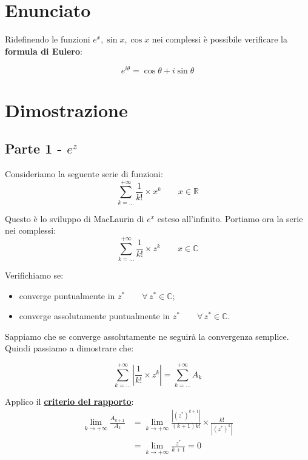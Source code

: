 \documentclass[../../dimostrazioni]{subfiles}
\begin{document}
        \section*{Enunciato}

            Ridefinendo le funzioni \( e^x, \sin x, \cos x \) nei complessi è possibile verificare la \textbf{formula di Eulero}:

                \[  e^{i\theta} = \cos \theta + i \sin \theta \]

        \section*{Dimostrazione}

            \subsection*{Parte 1 - \(e^z\)}    

                Consideriamo la seguente serie di funzioni:
                \[  \sum_{k=\dots}^{+\infty} \frac{1}{k!} \times x^k \qquad x \in \mathbb{R}  \]

                Questo è lo sviluppo di MacLaurin di \(e^x\) esteso all'infinito. Portiamo ora la serie nei complessi:
                \[  \sum_{k=\dots}^{+\infty} \frac{1}{k!} \times z^k \qquad x \in \mathbb{C}  \]

                Verifichiamo se:
                \begin{itemize}
                    \item converge puntualmente in \(z^* \qquad \forall \, z^*  \in \mathbb{C}\);
                    \item converge assolutamente puntualmente in \(z^* \qquad \forall \, z^*  \in \mathbb{C}\).
                \end{itemize}
            
                Sappiamo che se converge assolutamente ne seguirà la convergenza semplice. Quindi passiamo a dimostrare che:

                \[  \sum_{k=\dots}^{+\infty} \left| \frac{1}{k!} \times z^k \right| = \sum_{k=\dots}^{+\infty} A_k \]

                Applico il \textbf{\hyperref[criterioRapportoSerie]{criterio del rapporto}}:
                \begin{align*}
                    \lim_{k \to +\infty} \frac{A_{k+1}}{A_k} &= \lim_{k \to +\infty} \frac{\left|(z^*)^{k+1}\right|}{(k+1)k!} \times \frac{k!}{\left|(z^*)^k\right|} \\
                    &= \lim_{k \to +\infty} \frac{z^*}{k+1} = 0
                \end{align*}
\end{document}
